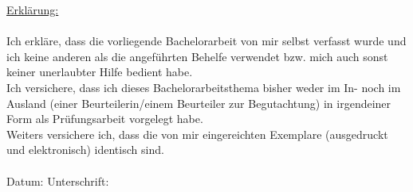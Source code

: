 \newpage

\vspace*{17cm}

\hspace*{-0.7cm} \underline{Erklärung:}\\\\
Ich erkläre, dass die vorliegende Bachelorarbeit von mir selbst verfasst wurde und ich keine anderen als die angeführten Behelfe verwendet bzw. mich auch sonst keiner unerlaubter Hilfe bedient habe.\\
Ich versichere, dass ich dieses Bachelorarbeitsthema bisher weder im In- noch im Ausland (einer Beurteilerin/einem Beurteiler zur Begutachtung) in irgendeiner Form als Prüfungsarbeit vorgelegt habe.\\
Weiters versichere ich, dass die von mir eingereichten Exemplare (ausgedruckt und elektronisch) identisch sind.\\\\
Datum: \hspace{6cm} Unterschrift:\\







